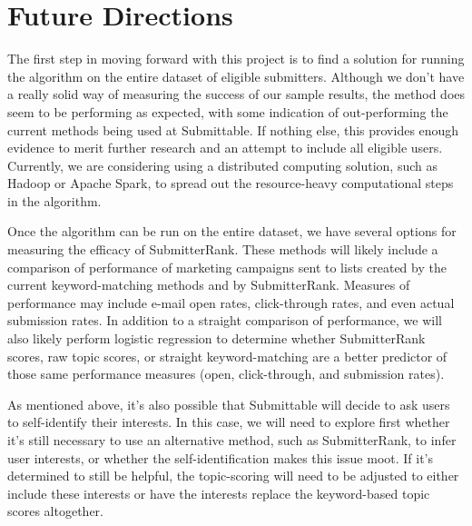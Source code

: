 \documentclass[12pt]{report}   %
\begin{document}
\section{Future Directions}

The first step in moving forward with this project is to find a solution for running the algorithm on the entire dataset of eligible submitters. Although we don't have a really solid way of measuring the success of our sample results, the method does seem to be performing as expected, with some indication of out-performing the current methods being used at Submittable. If nothing else, this provides enough evidence to merit further research and an attempt to include all eligible users. Currently, we are considering using a distributed computing solution, such as Hadoop or Apache Spark, to spread out the resource-heavy computational steps in the algorithm.

Once the algorithm can be run on the entire dataset, we have several options for measuring the efficacy of SubmitterRank. These methods will likely include a comparison of performance of marketing campaigns sent to lists created by the current keyword-matching methods and by SubmitterRank. Measures of performance may include e-mail open rates, click-through rates, and even actual submission rates. In addition to a straight comparison of performance, we will also likely perform logistic regression to determine whether SubmitterRank scores, raw topic scores, or straight keyword-matching are a better predictor of those same performance measures (open, click-through, and submission rates).

As mentioned above, it's also possible that Submittable will decide to ask users to self-identify their interests. In this case, we will need to explore first whether it's still necessary to use an alternative method, such as SubmitterRank, to infer user interests, or whether the self-identification makes this issue moot. If it's determined to still be helpful, the topic-scoring will need to be adjusted to either include these interests or have the interests replace the keyword-based topic scores altogether.




\end{document}
